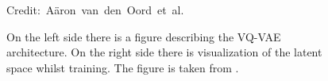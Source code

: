 \begin{figure}[H]
    \centering

    \caption{On the left side there is a figure describing the VQ-VAE architecture. On the right side there is visualization of the latent space whilst training. The figure is taken from \cite{vqvae}.}
  	\medskip 
	\hspace*{15pt}\hbox{\scriptsize Credit: Aäron van den Oord et al.}
    \label{VQVAEFigure}
\end{figure}


